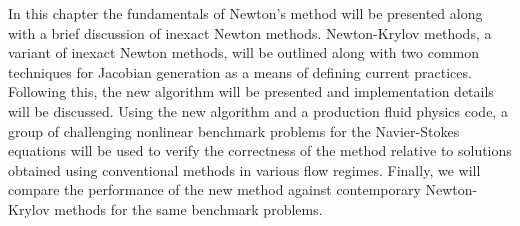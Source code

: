 In this chapter the fundamentals of Newton's method will be presented
along with a brief discussion of inexact Newton methods. Newton-Krylov
methods, a variant of inexact Newton methods, will be outlined along
with two common techniques for Jacobian generation as a means of
defining current practices. Following this, the new algorithm will be
presented and implementation details will be discussed. Using the new
algorithm and a production fluid physics code, a group of challenging
nonlinear benchmark problems for the Navier-Stokes equations will be
used to verify the correctness of the method relative to solutions
obtained using conventional methods in various flow regimes. Finally,
we will compare the performance of the new method against contemporary
Newton-Krylov methods for the same benchmark problems.

